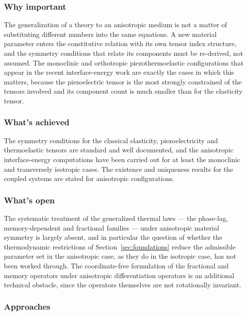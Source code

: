\subsubsection{Why important}

The generalization of a theory to an anisotropic medium is not a matter of substituting different numbers into the same equations. A new material parameter enters the constitutive relation with its own tensor index structure, and the symmetry conditions that relate its components must be re-derived, not assumed. The monoclinic and orthotropic piezothermoelastic configurations that appear in the recent interface-energy work \cite{Barak2023JTS} are exactly the cases in which this matters, because the piezoelectric tensor is the most strongly constrained of the tensors involved and its component count is much smaller than for the elasticity tensor.

\subsubsection{What's achieved}

The symmetry conditions for the classical elasticity, piezoelectricity and thermoelastic tensors are standard and well documented, and the anisotropic interface-energy computations have been carried out for at least the monoclinic and transversely isotropic cases. The existence and uniqueness results for the coupled systems \cite{Iesan2013} are stated for anisotropic configurations.

\subsubsection{What's open}

The systematic treatment of the generalized thermal laws --- the phase-lag, memory-dependent and fractional families --- under anisotropic material symmetry is largely absent, and in particular the question of whether the thermodynamic restrictions of Section~\ref{sec:foundations} reduce the admissible parameter set in the anisotropic case, as they do in the isotropic case, has not been worked through. The coordinate-free formulation of the fractional and memory operators under anisotropic differentiation operators is an additional technical obstacle, since the operators themselves are not rotationally invariant.

\subsubsection{Approaches}

